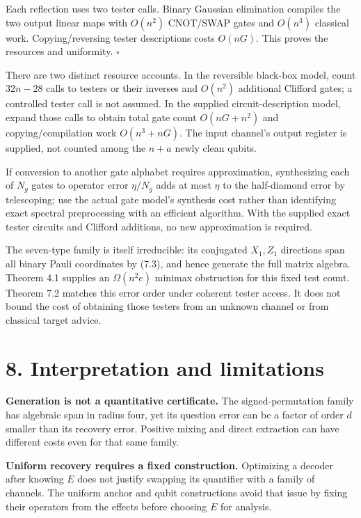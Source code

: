 \documentclass[11pt]{article}
\begin{document}
Each reflection uses two tester calls. Binary Gaussian elimination compiles
the two output linear maps with \(O(n^2)\) CNOT/SWAP gates and \(O(n^3)\)
classical work. Copying/reversing tester descriptions costs \(O(nG)\).
This proves the resources and uniformity. \hfill\(\square\)

There are two distinct resource accounts. In the reversible black-box model,
count \(32n-28\) calls to testers or their inverses and \(O(n^2)\) additional
Clifford gates; a controlled tester call is not assumed. In the supplied
circuit-description model, expand those calls to obtain total gate count
\(O(nG+n^2)\) and copying/compilation work \(O(n^3+nG)\). The input channel's
output register is supplied, not counted among the \(n+a\) newly clean qubits.

If conversion to another gate alphabet requires approximation, synthesizing
each of \(N_g\) gates to operator error \(\eta/N_g\) adds at most \(\eta\)
to the half-diamond error by telescoping; use the actual gate model's
synthesis cost rather than identifying exact spectral preprocessing with an
efficient algorithm. With the supplied exact tester circuits and Clifford
additions, no new approximation is required.

The seven-type family is itself irreducible: its conjugated \(X_1,Z_1\)
directions span all binary Pauli coordinates by (7.3), and hence generate
the full matrix algebra. Theorem 4.1 supplies an \(\Omega(n^2e)\) minimax
obstruction for this fixed test count. Theorem 7.2 matches this error order
under coherent tester access. It does not bound the cost of obtaining those
testers from an unknown channel or from classical target advice.

\section*{8. Interpretation and limitations}

\textbf{Generation is not a quantitative certificate.} The signed-permutation
family has algebraic span in radius four, yet its question error can be a
factor of order \(d\) smaller than its recovery error. Positive mixing and
direct extraction can have different costs even for that same family.

\textbf{Uniform recovery requires a fixed construction.} Optimizing a decoder after knowing
\(E\) does not justify swapping its quantifier with a family of channels.
The uniform anchor and qubit constructions avoid that issue by fixing their
operators from the effects before choosing \(E\) for analysis.
\end{document}
